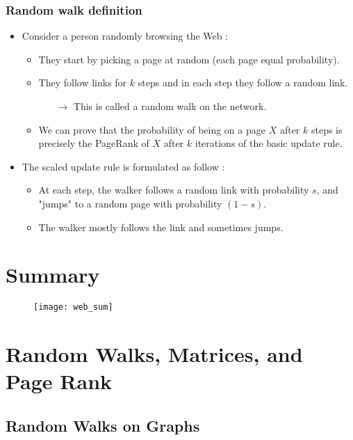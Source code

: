 \subsubsection{Random walk definition}

\begin{itemize}
\item Consider a person randomly browsing the Web :
	\begin{itemize}
	\item They start by picking a page at random (each page equal probability).
	\item They follow links for $k$ steps and in each step they follow a random link.
		\begin{itemize}
		\item[$\rightarrow$] This is called a random walk on the network.
		\end{itemize}
	\item We can prove that the probability of being on a page $X$ after $k$ steps is precisely the PageRank of $X$ after $k$ iterations of the basic update rule.
	\end{itemize}
\item The scaled update rule is formulated as follow :
	\begin{itemize}
	\item At each step, the walker follows a random link with probability $s$, and "jumps" to a random page with probability $(1-s)$.
	\item The walker mostly follows the link and sometimes jumps.
	\end{itemize}
\end{itemize}

\section{Summary}

\begin{figure}[H]
    \centering
    \texttt{[image: web\_sum]}
\end{figure}

\section{Random Walks, Matrices, and Page Rank}

\subsection{Random Walks on Graphs}

